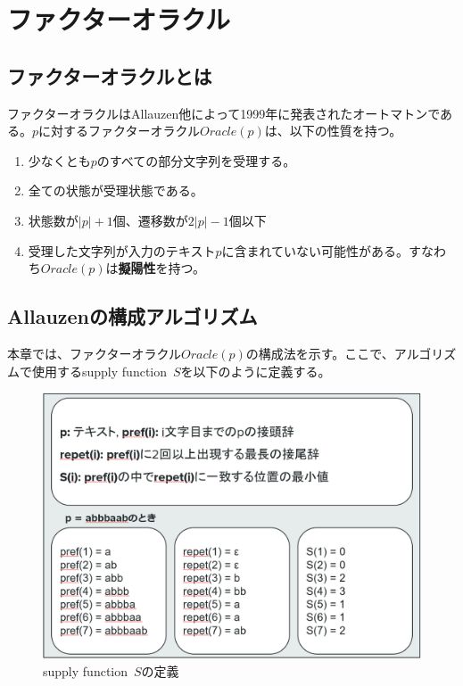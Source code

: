 \documentclass[11pt,a4paper]{jreport}
\begin{document}
  \chapter{ファクターオラクル}
  \section{ファクターオラクルとは}
 ファクターオラクル\cite{allauzen}はAllauzen他によって1999年に発表されたオートマトンである。$p$に対するファクターオラクル$Oracle(p)$は、以下の性質を持つ。
  \begin{enumerate}
    \item 少なくとも$p$のすべての部分文字列を受理する。
    \item 全ての状態が受理状態である。
    \item 状態数が$|p|+1$個、遷移数が$2|p|-1$個以下
    \item 受理した文字列が入力のテキスト$p$に含まれていない可能性がある。すなわち$Oracle(p)$は\textbf{擬陽性}を持つ。
  \end{enumerate}

  \section{Allauzenの構成アルゴリズム}
  本章では、ファクターオラクル$Oracle(p)$の構成法を示す。ここで、アルゴリズムで使用するsupply function\ $S$を以下のように定義する。

  \begin{figure}[htbp]
    \centering
    \includegraphics[width=12cm]{defsup.png}
    \caption{supply function\ $S$の定義}
  \end{figure}
  \newpage
\end{document}
